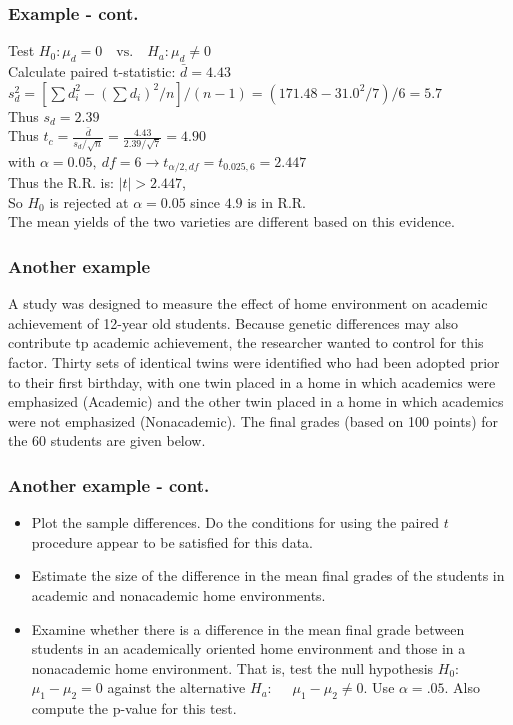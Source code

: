 \documentclass[xcolor=dvipsnames,12pt]{beamer}
\begin{document}
\begin{frame}
\frametitle{Example - cont.}
\hspace*{.3in} Test $H_0: \mu_d = 0 \quad \mbox{vs.} \quad H_a: \mu_d \neq 0$\\[.1in]
Calculate paired t-statistic:  $ \bar{d} = 4.43$\\[.1in]
 $ s_d^2 = [\sum{d_i^2} - (\sum{d_i})^2/n]/(n-1)= (171.48-31.0^2/7)/6=5.7$\\[.1in]
\hspace*{.3in} Thus $s_d = 2.39$\\[.1in]
\hspace*{.3in} Thus $ t_c = \frac{\bar{d}}{s_d/\sqrt{n}} = \frac{4.43}{2.39/\sqrt{7}} = 4.90 $\\[.1in]
 with $\alpha  =  0.05,\ df = 6 \rightarrow t_{\alpha/2,df}= t_{0.025,6} = 2.447$\\[.1in] 
\hspace*{.3in} Thus the R.R. is: $ |t| > 2.447$, \\[.1in]
 So  $H_0$ is rejected at $\alpha= 0.05$ since $4.9$ is in R.R.\\[.1in]
 The mean yields of the  two varieties are different based on this
evidence.
\end{frame}

   
\begin{frame}
\frametitle{Another example}
 A study was designed to measure the 
effect of home environment on academic achievement of 12-year old
students. Because genetic differences may also contribute tp
academic achievement, the researcher wanted to control for
this factor. Thirty sets of identical twins were identified 
who had been adopted prior to their first birthday, with one twin
placed in a home in which academics were emphasized (Academic) and
the other twin placed in a home in which academics were not
emphasized (Nonacademic). The final grades (based on 100 points) for
the 60 students are given below.
\end{frame}

\begin{frame}
\frametitle{Another example - cont.}
\begin{itemize}
\item[a.] Plot the sample differences.  Do the conditions for using
the paired $t$ procedure appear to be satisfied for this data.
\item[b.] Estimate the size of the difference in the mean final
grades of the students in academic and nonacademic home environments.
\item[c.] Examine whether there is a difference in the mean final
grade between students in an academically oriented home environment 
and those in a nonacademic home environment. That is, test the null 
hypothesis $H_0:$  \ \ $\mu_1 - \mu_2 = 0$  against the alternative
$H_a:$ \ \ $\mu_1 - \mu_2 \neq 0$. Use $\alpha = .05.$ Also compute
the p-value for this test.
\end{itemize}
\end{frame}
\end{document}
